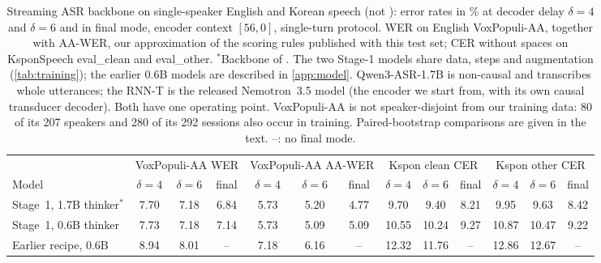 \begin{table}[t]
  \caption{Streaming ASR backbone on single-speaker English and Korean speech (not \task): error rates in \% at decoder delay $\delta=4$ and $\delta=6$ and in final mode, encoder context $[56,0]$, single-turn protocol. WER on English VoxPopuli-AA, together with AA-WER, our approximation of the scoring rules published with this test set; CER without spaces on KsponSpeech eval\_clean and eval\_other. $^\ast$Backbone of \model. The two Stage-1 models share data, steps and augmentation (\cref{tab:training}); the earlier 0.6B models are described in \cref{app:model}. Qwen3-ASR-1.7B is non-causal and transcribes whole utterances; the RNN-T is the released Nemotron~3.5 model (the encoder we start from, with its own causal transducer decoder). Both have one operating point. VoxPopuli-AA is not speaker-disjoint from our training data: 80 of its 207 speakers and 280 of its 292 sessions also occur in training. Paired-bootstrap comparisons are given in the text. --: no final mode.}
  \label{tab:backbone}
  \centering
  \footnotesize
  \setlength{\tabcolsep}{3.5pt}
  \begin{tabular}{@{}lcccccccccccc@{}}
    \toprule
    & \multicolumn{3}{c}{VoxPopuli-AA WER} & \multicolumn{3}{c}{VoxPopuli-AA AA-WER} & \multicolumn{3}{c}{Kspon clean CER} & \multicolumn{3}{c}{Kspon other CER} \\
    \cmidrule(lr){2-4}\cmidrule(lr){5-7}\cmidrule(lr){8-10}\cmidrule(l){11-13}
    Model & $\delta=4$ & $\delta=6$ & final & $\delta=4$ & $\delta=6$ & final & $\delta=4$ & $\delta=6$ & final & $\delta=4$ & $\delta=6$ & final \\
    \midrule
    Stage~1, 1.7B thinker$^\ast$   & 7.70 & 7.18 & 6.84 & 5.73 & 5.20 & 4.77 & 9.70  & 9.40  & 8.21 & 9.95  & 9.63  & 8.42 \\
    Stage~1, 0.6B thinker          & 7.73 & 7.18 & 7.14 & 5.73 & 5.09 & 5.09 & 10.55 & 10.24 & 9.27 & 10.87 & 10.47 & 9.22 \\
    Earlier recipe, 0.6B           & 8.94 & 8.01 & --   & 7.18 & 6.16 & --   & 12.32 & 11.76 & --   & 12.86 & 12.67 & --   \\

\end{tabular}
\end{table}

